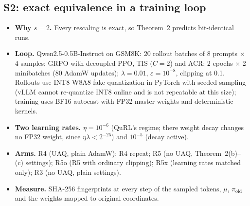 \documentclass[11pt]{article}
\begin{document}
\subsection{S2: exact equivalence in a training loop}\label{sec:s2}
\begin{itemize}
\item \textbf{Why $s=2$.} Every rescaling is exact, so Theorem~2 predicts bit-identical runs.
\item \textbf{Loop.} Qwen2.5-0.5B-Instruct on GSM8K: 20 rollout batches of 8 prompts $\times$ 4 samples; GRPO with decoupled PPO, TIS ($C=2$) and ACR; 2 epochs $\times$ 2 minibatches (80 AdamW updates); $\lambda=0.01$, $\varepsilon=10^{-8}$, clipping at 0.1. Rollouts use INT8 W8A8 fake quantization in PyTorch with seeded sampling (vLLM cannot re-quantize INT8 online and is not repeatable at this size); training uses BF16 autocast with FP32 master weights and deterministic kernels.
\item \textbf{Two learning rates.} $\eta=10^{-6}$ (QuRL's regime; there weight decay changes no FP32 weight, since $\eta\lambda<2^{-25}$) and $10^{-5}$ (decay active).
\item \textbf{Arms.} R4 (UAQ, plain AdamW); R4 repeat; R5 (no UAQ, Theorem~2(b)--(c) settings); R5o (R5 with ordinary clipping); R5x (learning rates matched only); R3 (no UAQ, plain settings).
\item \textbf{Measure.} SHA-256 fingerprints at every step of the sampled tokens, $\mu$, $\pi_{\mathrm{old}}$ and the weights mapped to original coordinates.
\end{itemize}
\end{document}
